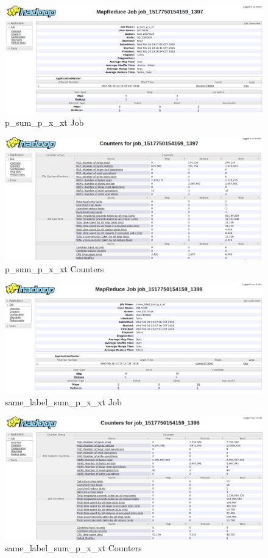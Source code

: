 \documentclass[a4paper,UTF8]{article}
\theoremstyle{definition}
\begin{document}
\begin{figure}[H]
	\centering
	\includegraphics[width=\textwidth]{pic/397_p_sum_p_x_xt_job.png}
	\caption{p\_sum\_p\_x\_xt Job}
\end{figure}
\begin{figure}[H]
	\centering
	\includegraphics[width=\textwidth]{pic/397_p_sum_p_x_xt_counters.png}
	\caption{p\_sum\_p\_x\_xt Counters}
\end{figure}

\begin{figure}[H]
	\centering
	\includegraphics[width=\textwidth]{pic/398_same_label_sum_p_x_xt_job.png}
	\caption{same\_label\_sum\_p\_x\_xt Job}
\end{figure}
\begin{figure}[H]
	\centering
	\includegraphics[width=\textwidth]{pic/398_same_label_sum_p_x_xt_counters.png}
	\caption{same\_label\_sum\_p\_x\_xt Counters}
\end{figure}
\end{document}
